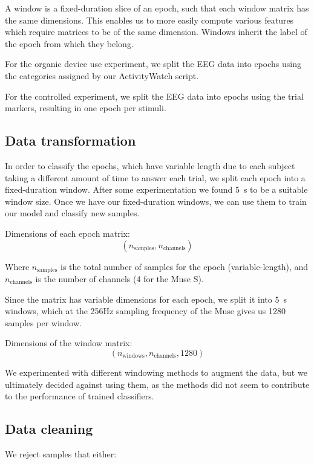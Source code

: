         A window is a fixed-duration slice of an epoch, such that each window matrix has the same dimensions. This enables us to more easily compute various features which require matrices to be of the same dimension. Windows inherit the label of the epoch from which they belong.

        For the organic device use experiment, we split the EEG data into epochs using the categories assigned by our ActivityWatch script.

        For the controlled experiment, we split the EEG data into epochs using the trial markers, resulting in one epoch per stimuli.

    \subsection{Data transformation}\label{section:transform}

        In order to classify the epochs, which have variable length due to each subject taking a different amount of time to answer each trial, we split each epoch into a fixed-duration window. After some experimentation we found \SI{5}{\second} to be a suitable window size. Once we have our fixed-duration windows, we can use them to train our model and classify new samples.

        Dimensions of each epoch matrix: \[ (n_{\mathrm{samples}}, n_{\mathrm{channels}}) \]

        Where $n_{\mathrm{samples}}$ is the total number of samples for the epoch (variable-length), and $n_{\mathrm{channels}}$ is the number of channels (4 for the Muse S).

        Since the matrix has variable dimensions for each epoch, we split it into \SI{5}{\second} windows, which at the 256Hz sampling frequency of the Muse gives us 1280 samples per window.

        Dimensions of the window matrix: \[ (n_{\mathrm{windows}}, n_{\mathrm{channels}}, 1280) \]

        We experimented with different windowing methods to augment the data, but we ultimately decided against using them, as the methods did not seem to contribute to the performance of trained classifiers.

    \subsection{Data cleaning}

        We reject samples that either:

